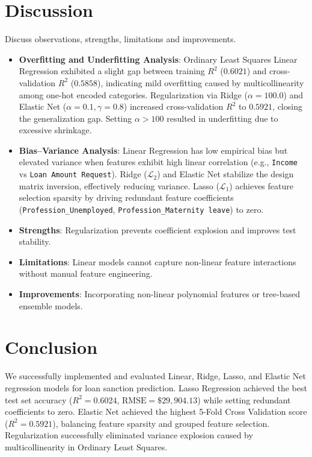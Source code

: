 \documentclass[12pt,a4paper]{article}
\begin{document}
\section{Discussion}
Discuss observations, strengths, limitations and improvements.
\begin{itemize}
\item \textbf{Overfitting and Underfitting Analysis}: Ordinary Least Squares Linear Regression exhibited a slight gap between training $R^2$ ($0.6021$) and cross-validation $R^2$ ($0.5858$), indicating mild overfitting caused by multicollinearity among one-hot encoded categories. Regularization via Ridge ($\alpha=100.0$) and Elastic Net ($\alpha=0.1, \gamma=0.8$) increased cross-validation $R^2$ to $0.5921$, closing the generalization gap. Setting $\alpha > 100$ resulted in underfitting due to excessive shrinkage.
\item \textbf{Bias--Variance Analysis}: Linear Regression has low empirical bias but elevated variance when features exhibit high linear correlation (e.g., \texttt{Income} vs \texttt{Loan Amount Request}). Ridge ($\mathcal{L}_2$) and Elastic Net stabilize the design matrix inversion, effectively reducing variance. Lasso ($\mathcal{L}_1$) achieves feature selection sparsity by driving redundant feature coefficients (\texttt{Profession\_Unemployed}, \texttt{Profession\_Maternity leave}) to zero.
\item \textbf{Strengths}: Regularization prevents coefficient explosion and improves test stability.
\item \textbf{Limitations}: Linear models cannot capture non-linear feature interactions without manual feature engineering.
\item \textbf{Improvements}: Incorporating non-linear polynomial features or tree-based ensemble models.
\end{itemize}

\section{Conclusion}
We successfully implemented and evaluated Linear, Ridge, Lasso, and Elastic Net regression models for loan sanction prediction. Lasso Regression achieved the best test set accuracy ($R^2 = 0.6024$, $\text{RMSE} = \$29,904.13$) while setting redundant coefficients to zero. Elastic Net achieved the highest 5-Fold Cross Validation score ($R^2 = 0.5921$), balancing feature sparsity and grouped feature selection. Regularization successfully eliminated variance explosion caused by multicollinearity in Ordinary Least Squares.
\end{document}
